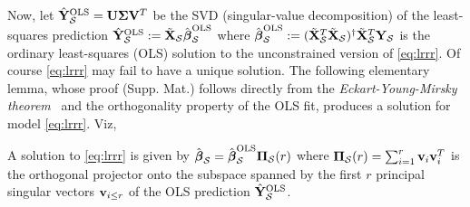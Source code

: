 Now, let $\hat{\mathbf{Y}}_{\mathcal S}^{\text{OLS}} = \mathbf{U} \boldsymbol{\Sigma} \mathbf{V}^T$ be the SVD
(singular-value decomposition) of the least-squares prediction
$\hat{\mathbf{Y}}_{\mathcal S}^{\text{OLS}} := \tilde{\mathbf{X}}_{\mathcal S}\hat{\boldsymbol{\beta}}_{\mathcal S}^{\text{OLS}}$ where
$\hat{\boldsymbol{\beta}}_{\mathcal S}^{\text{OLS}} := (\tilde{\mathbf{X}}_{\mathcal S}^T\tilde{\mathbf{X}}_{\mathcal S})^\dagger\tilde{\mathbf{X}}_{\mathcal S}^T\mathbf{Y}_{\mathcal S}$
is the ordinary least-squares (OLS) solution to the unconstrained version of \eqref{eq:lrrr}.
Of course \eqref{eq:lrrr} may fail to have a unique solution. The following elementary lemma,
whose proof  (Supp. Mat.) follows directly from the \textit{Eckart-Young-Mirsky theorem}~\citep{eckart2000}
and the orthogonality property of the OLS fit, produces a solution for model \eqref{eq:lrrr}. Viz,
\begin{lemma}
   A solution to \eqref{eq:lrrr} is given by
$\hat{\boldsymbol{\beta}}_{\mathcal S} = \hat{\boldsymbol{\beta}}_{\mathcal S}^{\text{OLS}}\boldsymbol{\Pi}_{\mathcal S}(r)$
  where $\boldsymbol{\Pi}_{\mathcal S}(r) = \sum_{i=1}^{r}\mathbf{v}_i\mathbf{v}_i^T$ is the orthogonal
  projector onto the subspace spanned by the first $r$ principal singular vectors $\mathbf{v}_{i \le r}$
  of the OLS prediction $\hat{\mathbf{Y}}_{\mathcal S}^{\text{OLS}}$.
  \label{thm:eym}
\end{lemma}

